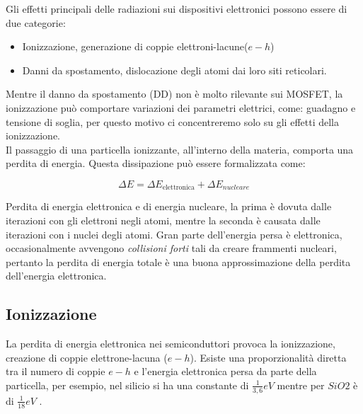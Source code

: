 
Gli effetti principali delle radiazioni sui dispositivi elettronici possono essere di due categorie\cite{bib:Effetti_Radiazioni_1987}:
\begin{itemize}
	\item Ionizzazione, generazione di coppie elettroni-lacune($e-h$)
	\item Danni da spostamento, dislocazione degli atomi dai loro siti reticolari.
\end{itemize}
Mentre il danno da spostamento (DD) non è molto rilevante sui MOSFET, la ionizzazione può comportare variazioni dei parametri elettrici, come: guadagno e tensione di soglia, per questo motivo ci concentreremo solo su gli effetti della ionizzazione.
\\

Il passaggio di una particella ionizzante, all'interno della materia, comporta una perdita di energia. Questa dissipazione può essere formalizzata come:

$$ \Delta E = \Delta E_{\text{elettronica}} + \Delta E_{nucleare} $$

Perdita di energia elettronica e di energia nucleare, la prima è dovuta dalle iterazioni con gli elettroni negli atomi, mentre la seconda è causata dalle iterazioni con i nuclei degli atomi.
Gran parte dell'energia persa è elettronica, occasionalmente avvengono \textit{collisioni forti} tali da creare frammenti nucleari, pertanto la perdita di energia totale è una buona approssimazione della perdita dell'energia elettronica\cite{bib:Effetti_Radiazioni_NASA}.
\\

\subsection{Ionizzazione}
La perdita di energia elettronica nei semiconduttori provoca la ionizzazione, creazione di coppie elettrone-lacuna ($e-h$). Esiste una proporzionalità diretta tra il numero di coppie $e-h$ e l'energia elettronica persa da parte della particella, per esempio, nel silicio si ha una constante di $\frac{1}{3,6}eV$ mentre per $SiO2$ è di $\frac{1}{18}eV$ \cite{bib:Effetti_Radiazioni_NASA}.
\\

